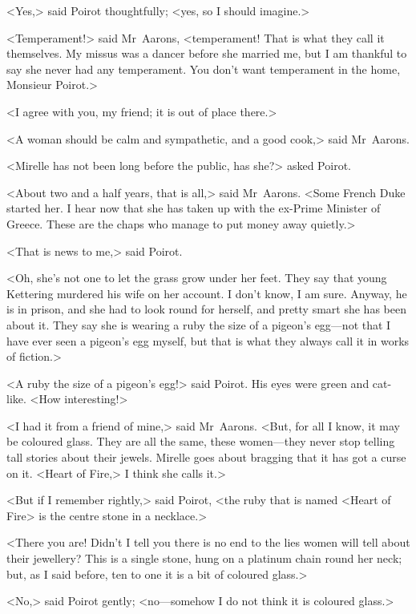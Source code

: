 <Yes,> said Poirot thoughtfully; <yes, so I should imagine.>

<Temperament!> said Mr~Aarons, <temperament! That is what they call it themselves. My missus was a dancer before she married me, but I am thankful to say she never had any temperament. You don't want temperament in the home, Monsieur Poirot.>

<I agree with you, my friend; it is out of place there.>

<A woman should be calm and sympathetic, and a good cook,> said Mr~Aarons.

<Mirelle has not been long before the public, has she?> asked Poirot.

<About two and a half years, that is all,> said Mr~Aarons. <Some French Duke started her. I hear now that she has taken up with the ex-Prime Minister of Greece. These are the chaps who manage to put money away quietly.>

<That is news to me,> said Poirot.

<Oh, she's not one to let the grass grow under her feet. They say that young Kettering murdered his wife on her account. I don't know, I am sure. Anyway, he is in prison, and she had to look round for herself, and pretty smart she has been about it. They say she is wearing a ruby the size of a pigeon's egg—not that I have ever seen a pigeon's egg myself, but that is what they always call it in works of fiction.>

<A ruby the size of a pigeon's egg!> said Poirot. His eyes were green and cat-like. <How interesting!>

<I had it from a friend of mine,> said Mr~Aarons. <But, for all I know, it may be coloured glass. They are all the same, these women—they never stop telling tall stories about their jewels. Mirelle goes about bragging that it has got a curse on it. <Heart of Fire,> I think she calls it.>

<But if I remember rightly,> said Poirot, <the ruby that is named <Heart of Fire> is the centre stone in a necklace.>

<There you are! Didn't I tell you there is no end to the lies women will tell about their jewellery? This is a single stone, hung on a platinum chain round her neck; but, as I said before, ten to one it is a bit of coloured glass.>

<No,> said Poirot gently; <no—somehow I do not think it is coloured glass.>